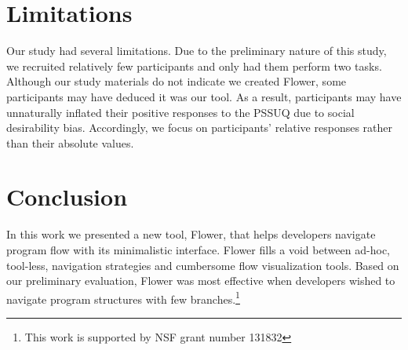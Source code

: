 \documentclass[conference]{IEEEtran}
\begin{document}
	




\section{Limitations}
Our study had several limitations.
Due to the preliminary nature of this study, we recruited relatively few participants and only had them perform two tasks.
Although our study materials do not indicate we created Flower, some participants may have deduced it was our tool.
As a result, participants may have unnaturally inflated their positive responses to the PSSUQ due to social desirability bias.
Accordingly, we focus on participants' relative responses rather than their absolute values.

\section{Conclusion}

In this work we presented a new tool, Flower, that helps developers navigate program flow with its minimalistic interface. 
Flower  fills a void between ad-hoc, tool-less, navigation strategies and cumbersome flow visualization tools.
Based on our preliminary evaluation, Flower  was most effective when developers wished to navigate program structures with few branches.\footnote{This work is supported by NSF grant number 131832}






\balance




\end{document}
